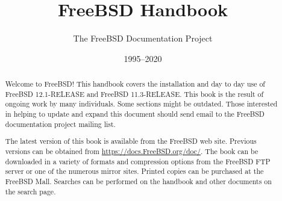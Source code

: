 \documentclass[a4paper,11pt]{memoir}
\title{FreeBSD Handbook}
\author{The FreeBSD Documentation Project}
\date{1995--2020}
\begin{document}
\frontmatter

\maketitle
\thispagestyle{empty}

\clearforchapter
\maketitle
\begin{abstract}
\noindent
Welcome to FreeBSD! This handbook covers the installation and day to day use of
FreeBSD 12.1-RELEASE and FreeBSD 11.3-RELEASE.
This book is the result of ongoing work by many individuals. Some sections might
be outdated.
Those interested in helping to update and expand this document should send email
to the FreeBSD documentation project mailing list.

The latest version of this book is available from the FreeBSD web site.
Previous versions can be obtained from \url{https://docs.FreeBSD.org/doc/}.
The book can be downloaded in a variety of formats and compression options from
the FreeBSD FTP server or one of the numerous mirror sites.
Printed copies can be purchased at the FreeBSD Mall.
Searches can be performed on the handbook and other documents on the search
page.
\end{abstract}


\clearforchapter\tableofcontents*



\end{document}
